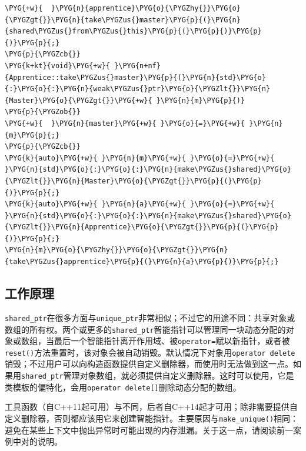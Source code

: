 \begin{itemize}
\begin{codeblockbg}
\begin{Verbatim}[commandchars=\\\{\},breaklines=true,breakanywhere=true,fontsize=\codefont,xleftmargin=17bp]
\PYG{+w}{  }\PYG{n}{apprentice}\PYG{o}{\PYGZhy{}}\PYG{o}{\PYGZgt{}}\PYG{n}{take\PYGZus{}master}\PYG{p}{(}\PYG{n}{shared\PYGZus{}from\PYGZus{}this}\PYG{p}{(}\PYG{p}{)}\PYG{p}{)}\PYG{p}{;}
\PYG{p}{\PYGZcb{}}
\PYG{k+kt}{void}\PYG{+w}{ }\PYG{n+nf}{Apprentice::take\PYGZus{}master}\PYG{p}{(}\PYG{n}{std}\PYG{o}{:}\PYG{o}{:}\PYG{n}{weak\PYGZus{}ptr}\PYG{o}{\PYGZlt{}}\PYG{n}{Master}\PYG{o}{\PYGZgt{}}\PYG{+w}{ }\PYG{n}{m}\PYG{p}{)}
\PYG{p}{\PYGZob{}}
\PYG{+w}{  }\PYG{n}{master}\PYG{+w}{ }\PYG{o}{=}\PYG{+w}{ }\PYG{n}{m}\PYG{p}{;}
\PYG{p}{\PYGZcb{}}
\PYG{k}{auto}\PYG{+w}{ }\PYG{n}{m}\PYG{+w}{ }\PYG{o}{=}\PYG{+w}{ }\PYG{n}{std}\PYG{o}{:}\PYG{o}{:}\PYG{n}{make\PYGZus{}shared}\PYG{o}{\PYGZlt{}}\PYG{n}{Master}\PYG{o}{\PYGZgt{}}\PYG{p}{(}\PYG{p}{)}\PYG{p}{;}
\PYG{k}{auto}\PYG{+w}{ }\PYG{n}{a}\PYG{+w}{ }\PYG{o}{=}\PYG{+w}{ }\PYG{n}{std}\PYG{o}{:}\PYG{o}{:}\PYG{n}{make\PYGZus{}shared}\PYG{o}{\PYGZlt{}}\PYG{n}{Apprentice}\PYG{o}{\PYGZgt{}}\PYG{p}{(}\PYG{p}{)}\PYG{p}{;}
\PYG{n}{m}\PYG{o}{\PYGZhy{}}\PYG{o}{\PYGZgt{}}\PYG{n}{take\PYGZus{}apprentice}\PYG{p}{(}\PYG{n}{a}\PYG{p}{)}\PYG{p}{;}
\end{Verbatim}
\end{codeblockbg}


\end{itemize}



\subsection{工作原理}



\texttt{shared\_\allowbreak{}ptr}在很多方面与\texttt{unique\_\allowbreak{}ptr}非常相似；不过它的用途不同：共享对象或数组的所有权。两个或更多的\texttt{shared\_\allowbreak{}ptr}智能指针可以管理同一块动态分配的对象或数组，当最后一个智能指针离开作用域、被\texttt{operator=}赋以新指针，或者被\texttt{reset()}方法重置时，该对象会被自动销毁。默认情况下对象用\texttt{operator delete}销毁；不过用户可以向构造函数提供自定义删除器，而使用时无法做到这一点。如果用\texttt{shared\_\allowbreak{}ptr}管理对象数组，就必须提供自定义删除器。这时可以使用，它是类模板的偏特化，会用\texttt{operator delete[]}删除动态分配的数组。



工具函数（自C++11起可用）与不同，后者自C++14起才可用；除非需要提供自定义删除器，否则都应该用它来创建智能指针。主要原因与\texttt{make\_\allowbreak{}unique()}相同：避免在某些上下文中抛出异常时可能出现的内存泄漏。关于这一点，请阅读前一案例中对的说明。



